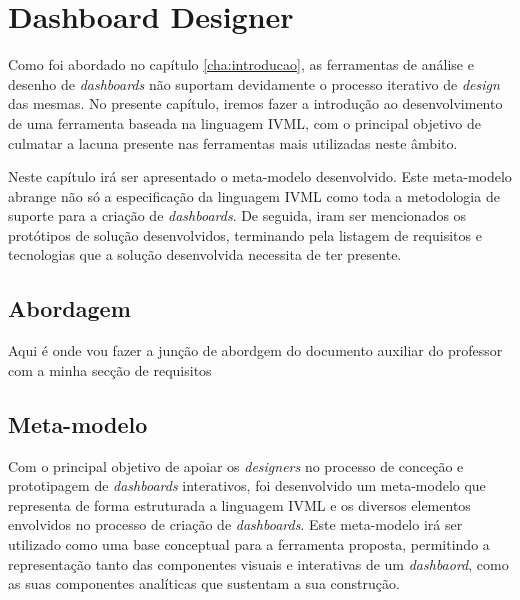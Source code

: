 
%

\chapter{Dashboard Designer}
\label{cha:dashboard_designer}

Como foi abordado no capítulo \ref{cha:introducao}, as ferramentas de análise e desenho de \textit{dashboards} não suportam devidamente o processo iterativo de \textit{design} das mesmas. No presente capítulo, iremos fazer a introdução ao desenvolvimento de uma ferramenta baseada na linguagem \gls{IVML}, com o principal objetivo de culmatar a lacuna presente nas ferramentas mais utilizadas neste âmbito.

Neste capítulo irá ser apresentado o meta-modelo desenvolvido. Este meta-modelo abrange não só a especificação da linguagem \gls{IVML} como toda a metodologia de suporte para a criação de \textit{dashboards}. De seguida, iram ser mencionados os protótipos de solução desenvolvidos, terminando pela listagem de requisitos e tecnologias que a solução desenvolvida necessita de ter presente.

\section{Abordagem} %
\label{sec:dashboard_abordagem}

Aqui é onde vou fazer a junção de abordgem do documento auxiliar do professor com a minha secção de requisitos

\section{Meta-modelo} %
\label{sec:meta_modelo}

Com o principal objetivo de apoiar os \textit{designers} no processo de conceção e prototipagem de \textit{dashboards} interativos, foi desenvolvido um meta-modelo que representa de forma estruturada a linguagem IVML e os diversos elementos envolvidos no processo de criação de \textit{dashboards}. Este meta-modelo irá ser utilizado como uma base conceptual para a ferramenta proposta, permitindo a representação tanto das componentes visuais e interativas de um \textit{dashbaord}, como as suas componentes analíticas que sustentam a sua construção.

